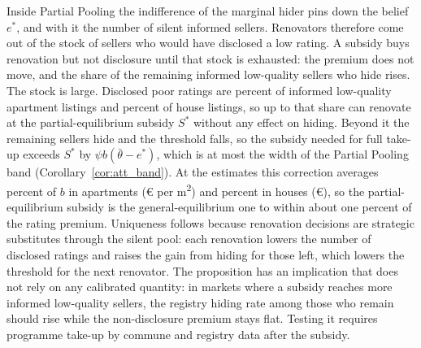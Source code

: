 Inside Partial Pooling the indifference of the marginal hider pins down the belief $e^*$, and with it the number of silent informed sellers. Renovators therefore come out of the stock of sellers who would have disclosed a low rating. A subsidy buys renovation but not disclosure until that stock is exhausted: the premium does not move, and the share of the remaining informed low-quality sellers who hide rises. The stock is large. Disclosed poor ratings are \attGeDisclosedShareApt{} percent of informed low-quality apartment listings and \attGeDisclosedShareHouse{} percent of house listings, so up to that share can renovate at the partial-equilibrium subsidy $S^*$ without any effect on hiding. Beyond it the remaining sellers hide and the threshold falls, so the subsidy needed for full take-up exceeds $S^*$ by $\psi b(\bar\theta-e^*)$, which is at most the width of the Partial Pooling band (Corollary~\ref{cor:att_band}). At the estimates this correction averages \attGeCorrPctBApt{} percent of $b$ in apartments (\euro{}\attGeCorrEurApt{} per m\textsuperscript{2}) and \attGeCorrPctBHouse{} percent in houses (\euro{}\attGeCorrEurHouse{}), so the partial-equilibrium subsidy is the general-equilibrium one to within about one percent of the rating premium. Uniqueness follows because renovation decisions are strategic substitutes through the silent pool: each renovation lowers the number of disclosed ratings and raises the gain from hiding for those left, which lowers the threshold for the next renovator. The proposition has an implication that does not rely on any calibrated quantity: in markets where a subsidy reaches more informed low-quality sellers, the registry hiding rate among those who remain should rise while the non-disclosure premium stays flat. Testing it requires programme take-up by commune and registry data after the subsidy.
